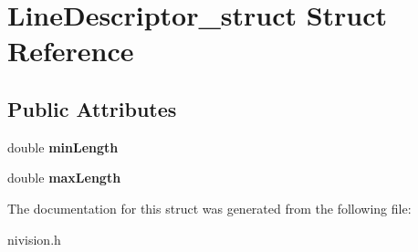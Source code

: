 \hypertarget{structLineDescriptor__struct}{
\section{LineDescriptor\_\-struct Struct Reference}
\label{structLineDescriptor__struct}
}
\subsection*{Public Attributes}
\begin{DoxyCompactItemize}
\item 
\hypertarget{structLineDescriptor__struct_a34386d166f65582c115c9c1a35fc89b9}{
double {\bfseries minLength}}
\label{structLineDescriptor__struct_a34386d166f65582c115c9c1a35fc89b9}

\item 
\hypertarget{structLineDescriptor__struct_a96536a3511185a8f0efec34c97ff1af8}{
double {\bfseries maxLength}}
\label{structLineDescriptor__struct_a96536a3511185a8f0efec34c97ff1af8}

\end{DoxyCompactItemize}


The documentation for this struct was generated from the following file:\begin{DoxyCompactItemize}
\item 
nivision.h\end{DoxyCompactItemize}
